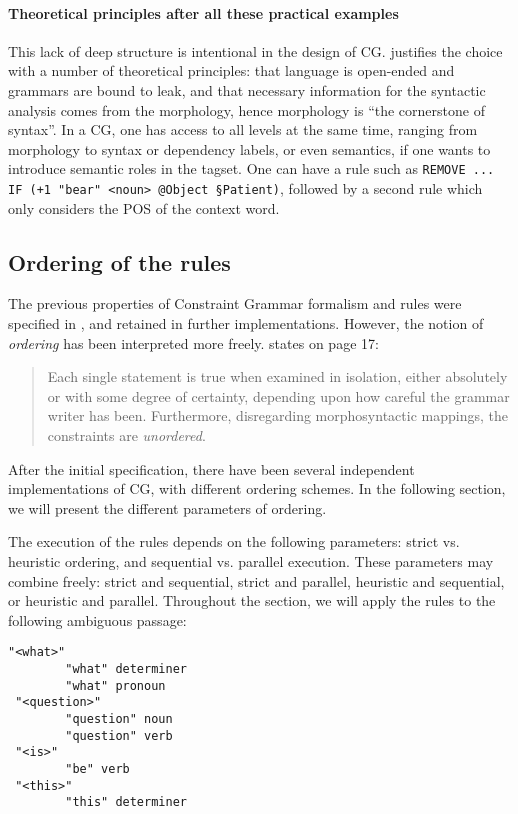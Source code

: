 \paragraph{Theoretical principles after all these practical examples} This lack of deep structure is intentional in the design of CG.
\cite{karlsson1995constraint} justifies the choice with a number of
theoretical principles: that language is open-ended and grammars are
bound to leak, and that necessary information for the syntactic analysis
comes from the morphology, hence morphology is ``the cornerstone of
syntax''. In a CG, one has access to all levels at the same time,
ranging from morphology to syntax or dependency labels, or even
semantics, if one wants to introduce semantic roles in the
tagset. One can have a rule such as \texttt{REMOVE ... IF (+1 "bear" <noun>
  @Object §Patient)}, followed by a second rule which only considers the POS of the
context word.

\subsection{Ordering of the rules}\label{ordering}

The previous properties of Constraint Grammar formalism and rules were specified in \cite{karlsson1995constraint}, and retained in further implementations.
However, the notion of \emph{ordering} has been interpreted more freely. 
\cite{karlsson1995constraint} states on page 17:

\begin{quote} 
Each single statement is true when examined in isolation, either absolutely or with some degree of certainty, depending upon how careful the grammar writer has been. Furthermore, disregarding morphosyntactic mappings, the constraints are \emph{unordered}.
\end{quote}

After the initial specification, there have been several independent implementations of CG, with different ordering schemes. In the following section, we will present the different parameters of ordering.

The execution of the rules depends on the following parameters: strict vs. heuristic ordering, and sequential vs. parallel execution. These parameters may combine freely: strict and sequential, strict and parallel, heuristic and sequential, or heuristic and parallel. Throughout the section, we will apply the rules to the following ambiguous passage:
\begin{verbatim}
"<what>"
        "what" determiner
        "what" pronoun                                        
 "<question>"
        "question" noun
        "question" verb
 "<is>"
        "be" verb
 "<this>"
        "this" determiner
\end{verbatim}

